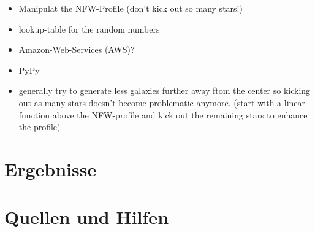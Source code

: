 \documentclass[a4paper,12pt]{scrartcl}
\begin{document}
\begin{itemize}
  \item Manipulat the NFW-Profile (don't kick out so many stars!)
  \item lookup-table for the random numbers
  \item Amazon-Web-Services (AWS)?
  \item PyPy
  \item generally try to generate less galaxies further away ftom the center
  so kicking out as many stars doesn't become problematic anymore.
  (start with a linear function above the NFW-profile and kick out the remaining
  stars to enhance the profile)
\end{itemize}



\newpage

\section{Ergebnisse} \label{ergebnisse}

\newpage

\section{Quellen und Hilfen} \label{quellen}

\end{document}
